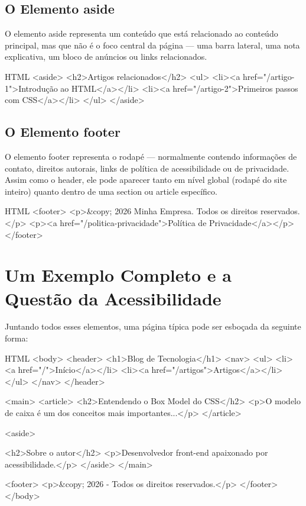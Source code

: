 \subsection{O Elemento aside}

O elemento aside representa um conteúdo que está relacionado ao conteúdo principal, mas que não é o foco central da página — uma barra lateral, uma nota explicativa, um bloco de anúncios ou links relacionados.

\begin{codebox}{HTML}
<aside>
  <h2>Artigos relacionados</h2>
  <ul>
    <li><a href="/artigo-1">Introdução ao HTML</a></li>
    <li><a href="/artigo-2">Primeiros passos com CSS</a></li>
  </ul>
</aside>
\end{codebox}

\subsection{O Elemento footer}

O elemento footer representa o rodapé — normalmente contendo informações de contato, direitos autorais, links de política de acessibilidade ou de privacidade. Assim como o header, ele pode aparecer tanto em nível global (rodapé do site inteiro) quanto dentro de uma section ou article específico.

\begin{codebox}{HTML}
<footer>
  <p>&copy; 2026 Minha Empresa. Todos os direitos reservados.</p>
  <p><a href="/politica-privacidade">Política de Privacidade</a></p>
</footer>
\end{codebox}

\section{Um Exemplo Completo e a Questão da Acessibilidade}

Juntando todos esses elementos, uma página típica pode ser esboçada da seguinte forma:

\begin{codebox}{HTML}
<body>
  <header>
    <h1>Blog de Tecnologia</h1>
    <nav>
       <ul>
         <li><a href="/">Início</a></li>
         <li><a href="/artigos">Artigos</a></li>
       </ul>
    </nav>
  </header>

   <main>
     <article>
       <h2>Entendendo o Box Model do CSS</h2>
       <p>O modelo de caixa é um dos conceitos mais importantes...</p>
     </article>

     <aside>



         <h2>Sobre o autor</h2>
         <p>Desenvolvedor front-end apaixonado por acessibilidade.</p>
       </aside>
     </main>

  <footer>
    <p>&copy; 2026 - Todos os direitos reservados.</p>
  </footer>
</body>
\end{codebox}

